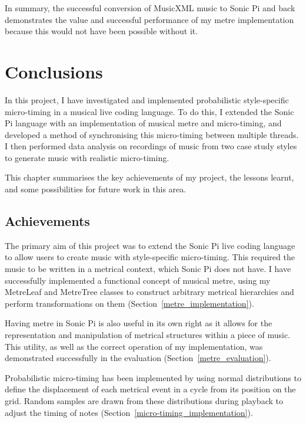 \documentclass[12pt,twoside,openright]{report}
\begin{document}
In summary, the successful conversion of MusicXML music to Sonic Pi and back
demonstrates the value and successful performance of my metre implementation
because this would not have been possible without it.





\chapter{Conclusions} \label{conclusions}

In this project, I have investigated and implemented probabilistic
style-specific micro-timing in a musical live coding language. To do this, I
extended the Sonic Pi language with an implementation of musical metre and
micro-timing, and developed a method of synchronising this micro-timing between
multiple threads. I then performed data analysis on recordings of music from two
case study styles to generate music with realistic micro-timing.

This chapter summarises the key achievements of my project, the lessons learnt,
and some possibilities for future work in this area.



\section{Achievements} \label{achievements}

The primary aim of this project was to extend the Sonic Pi live coding language
to allow users to create music with style-specific micro-timing. This required
the music to be written in a metrical context, which Sonic Pi does not have. I
have successfully implemented a functional concept of musical metre, using my
MetreLeaf and MetreTree classes to construct arbitrary metrical hierarchies and
perform transformations on them (Section~\ref{metre_implementation}).

Having metre in Sonic Pi is also useful in its own right as it allows for the
representation and manipulation of metrical structures within a piece of music.
This utility, as well as the correct operation of my implementation, was
demonstrated successfully in the evaluation (Section~\ref{metre_evaluation}).

Probabilistic micro-timing has been implemented by using normal distributions to
define the displacement of each metrical event in a cycle from its position on the
grid. Random samples are drawn from these distributions during playback to
adjust the timing of notes (Section~\ref{micro-timing_implementation}).
\end{document}
